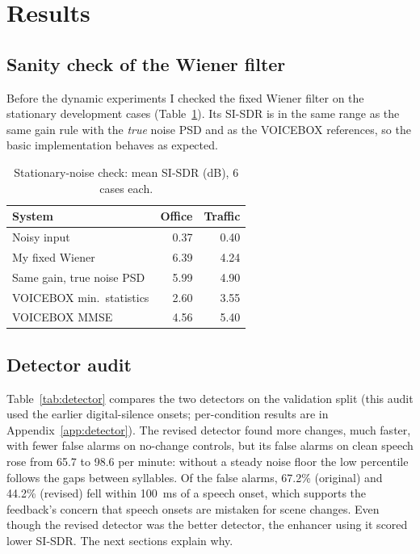 \documentclass[10pt,conference,a4paper]{IEEEtran}
\begin{document}
\section{Results}
\label{sec:results}

\subsection{Sanity check of the Wiener filter}
Before the dynamic experiments I checked the fixed Wiener filter on the
stationary development cases (Table~\ref{tab:refcheck}). Its SI-SDR is in the
same range as the same gain rule with the \emph{true} noise PSD and as the
VOICEBOX references, so the basic implementation behaves as expected.

\begin{table}[t]
\centering
\caption{Stationary-noise check: mean SI-SDR (dB), 6 cases each.}
\label{tab:refcheck}
\footnotesize
\begin{tabular}{@{}lrr@{}}
\toprule
System & Office & Traffic\\
\midrule
Noisy input & 0.37 & 0.40\\
My fixed Wiener & 6.39 & 4.24\\
Same gain, true noise PSD & 5.99 & 4.90\\
VOICEBOX min.\ statistics & 2.60 & 3.55\\
VOICEBOX MMSE & 4.56 & 5.40\\
\bottomrule
\end{tabular}
\end{table}

\subsection{Detector audit}
Table~\ref{tab:detector} compares the two detectors on the validation split
(this audit used the earlier digital-silence onsets; per-condition results are
in Appendix~\ref{app:detector}). The revised detector found more changes, much
faster, with fewer false alarms on no-change controls, but its false alarms on
clean speech rose from 65.7 to 98.6 per minute: without a steady noise floor the
low percentile follows the gaps between syllables. Of the false alarms, 67.2\%
(original) and 44.2\% (revised) fell within 100~ms of a speech onset, which
supports the feedback's concern that speech onsets are mistaken for scene
changes. Even though the revised detector was the better detector, the enhancer
using it scored lower SI-SDR. The next sections explain why.
\end{document}
